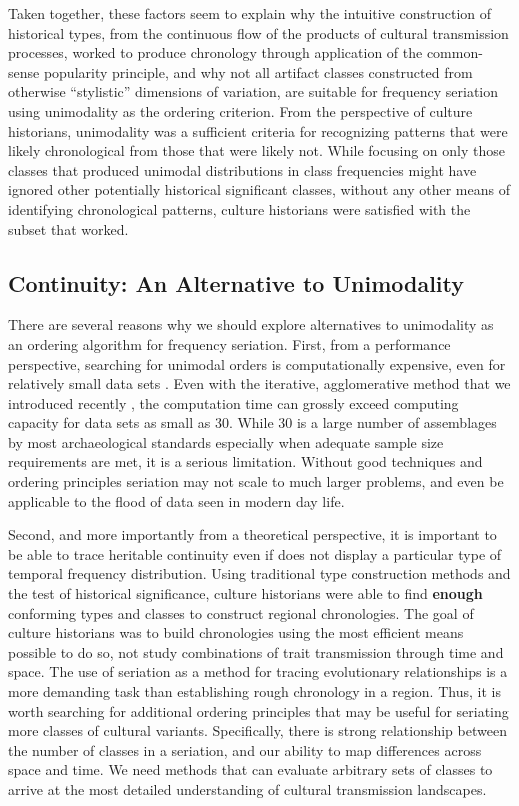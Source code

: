 \documentclass[graybox,natbib]{svmult}
\begin{document}
Taken together, these factors seem to explain why the intuitive
construction of historical types, from the continuous flow of the
products of cultural transmission processes, worked to produce
chronology through application of the common-sense popularity principle,
and why not all artifact classes constructed from otherwise
``stylistic'' dimensions of variation, are suitable for frequency
seriation using unimodality as the ordering criterion. From the
perspective of culture historians, unimodality was a sufficient criteria
for recognizing patterns that were likely chronological from those that
were likely not. While focusing on only those classes that produced
unimodal distributions in class frequencies might have ignored other
potentially historical significant classes, without any other means of
identifying chronological patterns, culture historians were satisfied
with the subset that worked.

\subsection{Continuity: An Alternative to
Unimodality}\label{continuity-an-alternative-to-unimodality}

There are several reasons why we should explore alternatives to
unimodality as an ordering algorithm for frequency seriation. First,
from a performance perspective, searching for unimodal orders is
computationally expensive, even for relatively small data sets
\citep{Madsen2014}. Even with the iterative, agglomerative method that
we introduced recently \citep{lipomadsendunnell2015}, the computation
time can grossly exceed computing capacity for data sets as small as 30.
While 30 is a large number of assemblages by most archaeological
standards especially when adequate sample size requirements are met, it
is a serious limitation. Without good techniques and ordering principles
seriation may not scale to much larger problems, and even be applicable
to the flood of data seen in modern day life.

Second, and more importantly from a theoretical perspective, it is
important to be able to trace heritable continuity even if does not
display a particular type of temporal frequency distribution. Using
traditional type construction methods and the test of historical
significance, culture historians were able to find \textbf{enough}
conforming types and classes to construct regional chronologies. The
goal of culture historians was to build chronologies using the most
efficient means possible to do so, not study combinations of trait
transmission through time and space. The use of seriation as a method
for tracing evolutionary relationships is a more demanding task than
establishing rough chronology in a region. Thus, it is worth searching
for additional ordering principles that may be useful for seriating more
classes of cultural variants. Specifically, there is strong relationship
between the number of classes in a seriation, and our ability to map
differences across space and time. We need methods that can evaluate
arbitrary sets of classes to arrive at the most detailed understanding
of cultural transmission landscapes.
\end{document}

